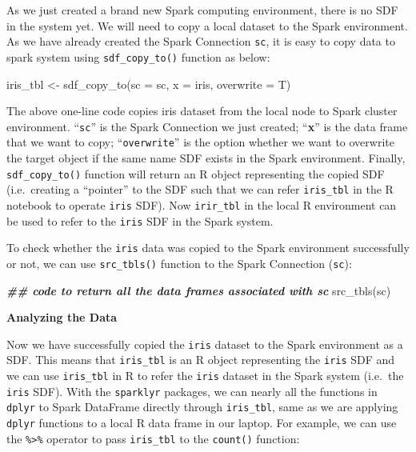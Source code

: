 \documentclass[
  12pt,
]{krantz}
\makeatletter
\newenvironment{Shaded}{\begin{snugshade}}{\end{snugshade}}
\newcommand{\AttributeTok}[1]{\textcolor[rgb]{0.61,0.61,0.61}{#1}}
\newcommand{\DocumentationTok}[1]{\textcolor[rgb]{0.37,0.37,0.37}{\textbf{\textit{#1}}}}
\newcommand{\FunctionTok}[1]{\textcolor[rgb]{0,0,0}{#1}}
\newcommand{\NormalTok}[1]{#1}
\newcommand{\OtherTok}[1]{\textcolor[rgb]{0.37,0.37,0.37}{#1}}
\newenvironment{kframe}{%
\medskip{}
\setlength{\fboxsep}{.8em}
 \def\at@end@of@kframe{}%
 \ifinner\ifhmode%
  \def\at@end@of@kframe{\end{minipage}}%
  \begin{minipage}{\columnwidth}%
 \fi\fi%
 \def\FrameCommand##1{\hskip\@totalleftmargin \hskip-\fboxsep
 \colorbox{shadecolor}{##1}\hskip-\fboxsep
     \hskip-\linewidth \hskip-\@totalleftmargin \hskip\columnwidth}%
 \MakeFramed {\advance\hsize-\width
   \@totalleftmargin\z@ \linewidth\hsize
   \@setminipage}}%
 {\par\unskip\endMakeFramed%
 \at@end@of@kframe}
\renewenvironment{Shaded}{\begin{kframe}}{\end{kframe}}
\makeatother
\begin{document}
As we just created a brand new Spark computing environment, there is no SDF in the system yet. We will need to copy a local dataset to the Spark environment. As we have already created the Spark Connection \texttt{sc}, it is easy to copy data to spark system using \texttt{sdf\_copy\_to()} function as below:

\begin{Shaded}
\begin{Highlighting}[]
\NormalTok{iris\_tbl }\OtherTok{\textless{}{-}} \FunctionTok{sdf\_copy\_to}\NormalTok{(}\AttributeTok{sc =}\NormalTok{ sc, }\AttributeTok{x =}\NormalTok{ iris, }\AttributeTok{overwrite =}\NormalTok{ T)}
\end{Highlighting}
\end{Shaded}

The above one-line code copies iris dataset from the local node to Spark cluster environment. ``\texttt{sc}'' is the Spark Connection we just created; ``\textbf{x}'' is the data frame that we want to copy; ``\texttt{overwrite}'' is the option whether we want to overwrite the target object if the same name SDF exists in the Spark environment. Finally, \texttt{sdf\_copy\_to()} function will return an R object representing the copied SDF (i.e.~creating a ``pointer'' to the SDF such that we can refer \texttt{iris\_tbl} in the R notebook to operate \texttt{iris} SDF). Now \texttt{irir\_tbl} in the local R environment can be used to refer to the \texttt{iris} SDF in the Spark system.

To check whether the \texttt{iris} data was copied to the Spark environment successfully or not, we can use \texttt{src\_tbls()} function to the Spark Connection (\texttt{sc}):

\begin{Shaded}
\begin{Highlighting}[]
\DocumentationTok{\#\# code to return all the data frames associated with sc}
\FunctionTok{src\_tbls}\NormalTok{(sc) }
\end{Highlighting}
\end{Shaded}

\textbf{Analyzing the Data}

Now we have successfully copied the \texttt{iris} dataset to the Spark environment as a SDF. This means that \texttt{iris\_tbl} is an R object representing the \texttt{iris} SDF and we can use \texttt{iris\_tbl} in R to refer the \texttt{iris} dataset in the Spark system (i.e.~the \texttt{iris} SDF). With the \texttt{sparklyr} packages, we can nearly all the functions in \texttt{dplyr} to Spark DataFrame directly through \texttt{iris\_tbl}, same as we are applying \texttt{dplyr} functions to a local R data frame in our laptop. For example, we can use the \texttt{\%\textgreater{}\%} operator to pass \texttt{iris\_tbl} to the \texttt{count()} function:
\end{document}
